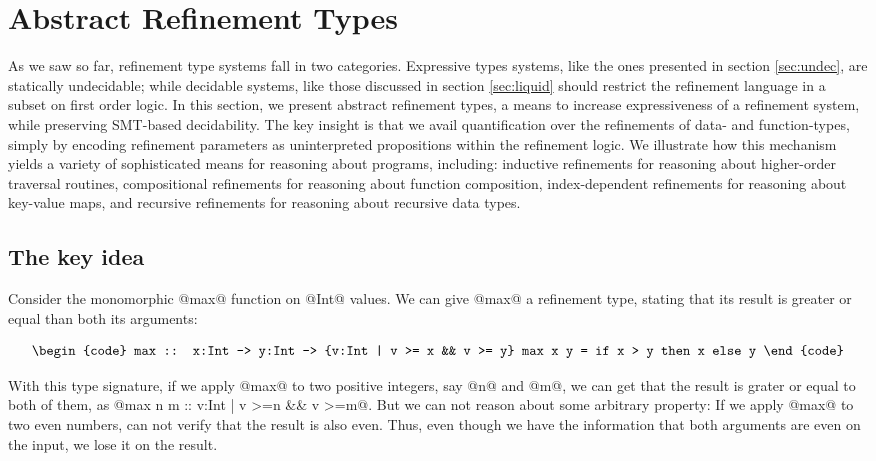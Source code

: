 \section{Abstract Refinement Types}\label{sec:abstract}

As we saw so far, refinement type systems fall in two categories.
Expressive types systems, like the ones presented in section \ref{sec:undec}, 
are statically undecidable; while decidable systems, like those discussed in section \ref{sec:liquid} 
should restrict the refinement language in a subset on first order logic.
%
In this section, we present abstract refinement types\cite{Vazou13},
a means to increase expressiveness of a refinement system,
while preserving SMT-based decidability.
%
The key insight is that we avail 
quantification over
the refinements of data- and function-types,
simply by encoding
refinement parameters as uninterpreted propositions within the refinement logic.
We illustrate how this mechanism yields a variety of sophisticated means for
reasoning about programs, including: 
inductive refinements for reasoning about higher-order traversal routines,
compositional refinements for reasoning about function composition,
index-dependent refinements for reasoning about key-value maps, and
recursive refinements for reasoning about recursive data types.

\subsection{The key idea}
Consider the monomorphic @max@ function on @Int@ values.
We can give @max@ a refinement type, stating that its result
is greater or equal than both its arguments:
  
$$\centering\begin{tabular}{c}
\begin{code}
max     :: x:Int -> y:Int -> {v:Int | v >= x && v >= y}
max x y = if x > y then x else y
\end{code}
\end{tabular}$$

With this type signature, if we apply @max@ to two positive integers, 
say @n@ and @m@, we can get that the result is grater or equal to both 
of them, as @max n m :: {v:Int | v >=n && v >=m}@.
But we can not reason about some arbitrary property: 
If we apply @max@ to two even numbers, can not verify that the result is 
also even.
%
Thus, even though we have the information that both arguments are even on the input, 
we lose it on the result.

